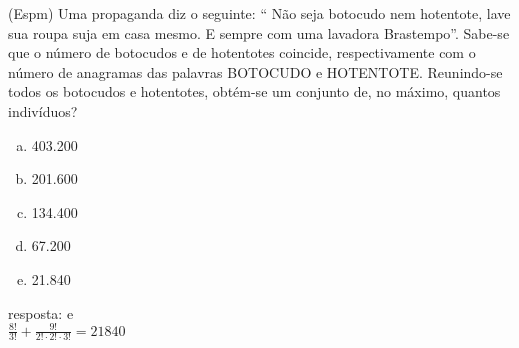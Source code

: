 \begin{ex}
(Espm) Uma propaganda diz o seguinte: “ Não seja botocudo nem hotentote, lave sua roupa suja em casa mesmo. E sempre com uma lavadora Brastempo”. Sabe-se que o número de botocudos e de hotentotes coincide, respectivamente com o número de anagramas das palavras BOTOCUDO e HOTENTOTE. Reunindo-se todos os botocudos e hotentotes, obtém-se um conjunto de, no máximo, quantos indivíduos?
   \begin{enumerate}[(a)]
   \item 403.200
   \item 201.600
   \item 134.400
   \item 67.200
   \item 21.840
   \end{enumerate}
     \begin{sol}
       resposta: e \\
       $\frac{8!}{3!}+\frac{9!}{2!\cdot2!\cdot3!}=21840$
     \end{sol}
\end{ex}